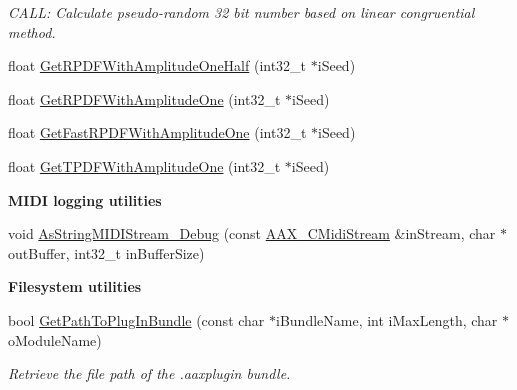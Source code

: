 \begin{DoxyCompactItemize}
\begin{DoxyCompactList}\small\item\em C\+A\+LL\+: Calculate pseudo-\/random 32 bit number based on linear congruential method. \end{DoxyCompactList}\item 
float \mbox{\hyperlink{a00852_a5a91375167236862abc93ad879639cab}{Get\+R\+P\+D\+F\+With\+Amplitude\+One\+Half}} (int32\+\_\+t $\ast$i\+Seed)
\item 
float \mbox{\hyperlink{a00852_a51d7a263d9053276c6cef1dbd2018ebe}{Get\+R\+P\+D\+F\+With\+Amplitude\+One}} (int32\+\_\+t $\ast$i\+Seed)
\item 
float \mbox{\hyperlink{a00852_a145cc6d06cd682e2d234d07ce939760e}{Get\+Fast\+R\+P\+D\+F\+With\+Amplitude\+One}} (int32\+\_\+t $\ast$i\+Seed)
\item 
float \mbox{\hyperlink{a00852_a42cc414ea1b868e26c591041a66ad8af}{Get\+T\+P\+D\+F\+With\+Amplitude\+One}} (int32\+\_\+t $\ast$i\+Seed)
\end{DoxyCompactItemize}
\begin{Indent}\textbf{ M\+I\+DI logging utilities}\par
\begin{DoxyCompactItemize}
\item 
void \mbox{\hyperlink{a00840_ga5b2751acd531f46a0e4dd68cd0863f46}{As\+String\+M\+I\+D\+I\+Stream\+\_\+\+Debug}} (const \mbox{\hyperlink{a01433}{A\+A\+X\+\_\+\+C\+Midi\+Stream}} \&in\+Stream, char $\ast$out\+Buffer, int32\+\_\+t in\+Buffer\+Size)
\end{DoxyCompactItemize}
\end{Indent}
\begin{Indent}\textbf{ Filesystem utilities}\par
\begin{DoxyCompactItemize}
\item 
bool \mbox{\hyperlink{a00840_ga0bf6aab757ecbd440276bb001de89f19}{Get\+Path\+To\+Plug\+In\+Bundle}} (const char $\ast$i\+Bundle\+Name, int i\+Max\+Length, char $\ast$o\+Module\+Name)
\begin{DoxyCompactList}\small\item\em Retrieve the file path of the .aaxplugin bundle. \end{DoxyCompactList}\end{DoxyCompactItemize}
\end{Indent}

